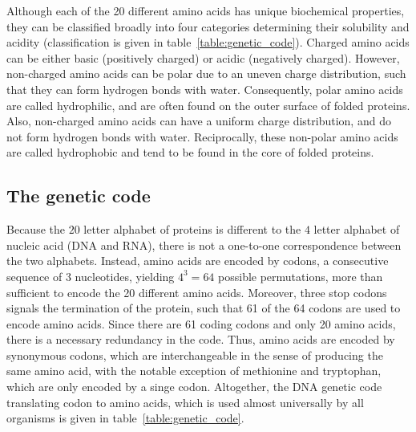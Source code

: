 Although each of the 20 different amino acids has unique biochemical properties, they can be classified broadly into four categories determining their solubility and acidity (classification is given in table~\ref{table:genetic_code}).
Charged amino acids can be either basic (positively charged) or acidic (negatively charged).
However, non-charged amino acids can be polar due to an uneven charge distribution, such that they can form hydrogen bonds with water.
Consequently, polar amino acids are called hydrophilic, and are often found on the outer surface of folded proteins.
Also, non-charged amino acids can have a uniform charge distribution, and do not form hydrogen bonds with water.
Reciprocally, these non-polar amino acids are called hydrophobic and tend to be found in the core of folded proteins.

\subsection{The genetic code}

Because the $20$ letter alphabet of proteins is different to the $4$ letter alphabet of nucleic acid (DNA and RNA), there is not a one-to-one correspondence between the two alphabets.
Instead, amino acids are encoded by codons, a consecutive sequence of 3 nucleotides, yielding $4^3=64$ possible permutations, more than sufficient to encode the 20 different amino acids.
Moreover, three stop codons signals the termination of the protein, such that 61 of the 64 codons are used to encode amino acids.
Since there are 61 coding codons and only 20 amino acids, there is a necessary redundancy in the code.
Thus, amino acids are encoded by synonymous codons, which are interchangeable in the sense of producing the same amino acid, with the notable exception of methionine and tryptophan, which are only encoded by a singe codon.
Altogether, the \acrshort{DNA} genetic code translating codon to amino acids, which is used almost universally by all organisms is given in table~\ref{table:genetic_code}.

